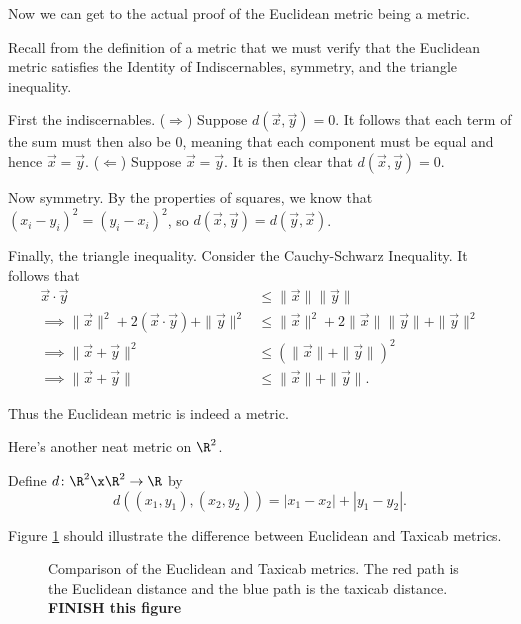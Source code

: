 \documentclass[class=article, crop=false]{standalone}
\begin{document}
Now we can get to the actual proof of the Euclidean metric being a metric.
\begin{pf}
    Recall from the definition of a metric that we must verify that the Euclidean metric satisfies the Identity of Indiscernables, symmetry, and the triangle inequality.

    First the indiscernables. ($\Rightarrow$) Suppose $d(\vec x, \vec y) = 0$. It follows that each term of the sum must then also be 0, meaning that each component must be equal and hence $\vec x = \vec y$. ($\Leftarrow$) Suppose $\vec x = \vec y$. It is then clear that $d( \vec x, \vec y ) = 0$.

    Now symmetry. By the properties of squares, we know that $(x_i-y_i)^2 = (y_i-x_i)^2$, so $d(\vec x, \vec y) = d( \vec y, \vec x)$.

    Finally, the triangle inequality. Consider the Cauchy-Schwarz Inequality. It follows that
        \begin{align*}
            \vec x \cdot \vec y &\leq \| \vec x\| \| \vec y\| \\
            \implies \|\vec x \|^2 + 2 (\vec x \cdot \vec y) + \| \vec y \|^2 &\leq \|\vec x \|^2 + 2 \| \vec x\| \| \vec y\| + \| \vec y \|^2 \\
            \implies \| \vec x + \vec y \|^2 &\leq ( \| \vec x \| + \| \vec y \|)^2 \\
            \implies \| \vec x + \vec y \| &\leq \| \vec x \| + \| \vec y \|.
        \end{align*}

    Thus the Euclidean metric is indeed a metric.
\end{pf}

Here's another neat metric on $\R^2$.
\begin{ex}
    Define $d \colon \R^2 \x \R^2 \to \R$ by
        \[
            d((x_1,y_1), (x_2,y_2)) = |x_1-x_2| + |y_1-y_2|.
        \]
\end{ex}
Figure \ref{fig:euclideanvstaxicab} should illustrate the difference between Euclidean and Taxicab metrics.

\begin{figure}[ht]
    \centering
    \caption{Comparison of the Euclidean and Taxicab metrics. The red path is the Euclidean distance and the blue path is the taxicab distance. \textbf{FINISH this figure}}
    \label{fig:euclideanvstaxicab}
\end{figure}
\end{document}
